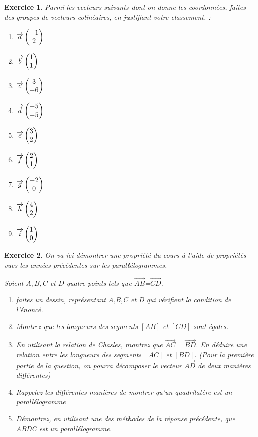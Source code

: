\documentclass[10pt,a4paper]{article}
\newtheorem{exo}{Exercice}
\begin{document}
\begin{exo}
    Parmi les vecteurs suivants dont on donne les coordonnées, faites des groupes de vecteurs colinéaires, en justifiant votre classement. : 
    \begin{multicols}{3}
        \begin{enumerate}
            \item  $\overrightarrow{a}  \begin{pmatrix} -1\\ 2 \end{pmatrix}$
            \item  $\overrightarrow{b}  \begin{pmatrix} 1\\ 1 \end{pmatrix}$
            \item  $\overrightarrow{c}  \begin{pmatrix} 3\\ -6 \end{pmatrix}$
            \item  $\overrightarrow{d}  \begin{pmatrix} -5\\ -5 \end{pmatrix}$
            \item  $\overrightarrow{e}  \begin{pmatrix} 3\\ 2 \end{pmatrix}$
            \item  $\overrightarrow{f}  \begin{pmatrix} 2\\ 1 \end{pmatrix}$
            \item  $\overrightarrow{g}  \begin{pmatrix} -2\\ 0 \end{pmatrix}$
            \item  $\overrightarrow{h}  \begin{pmatrix} 4\\ 2 \end{pmatrix}$
            \item  $\overrightarrow{i}  \begin{pmatrix} 1\\ 0 \end{pmatrix}$
        \end{enumerate}
    \end{multicols}
\end{exo}

\begin{exo}
    On va ici démontrer une propriété du cours à l'aide de propriétés vues les années précédentes sur les parallélogrammes.
    
    Soient $A,B,C$ et $D$ quatre points tels que $\overrightarrow{AB}$=$\overrightarrow{CD}$.
    
    \begin{enumerate}
        \item faites un dessin, représentant A,B,C et D qui vérifient la condition de l'énoncé.
        \item Montrez que les longueurs des segments $[AB]$ et $[CD]$ sont égales.
        \item En utilisant la relation de Chasles, montrez que $\overrightarrow{AC}=\overrightarrow{BD}$. En déduire une relation entre les longueurs des segments $[AC]$ et $[BD]$.  (Pour la première partie de la question, on pourra décomposer le vecteur $\overrightarrow{AD}$ de deux manières différentes)
        \item Rappelez les différentes manières de montrer qu'un quadrilatère est un parallélogramme
        \item Démontrez, en utilisant une des méthodes de la réponse précédente, que ABDC est un parallélogramme.
    \end{enumerate}
    
\end{exo}
\end{document}
